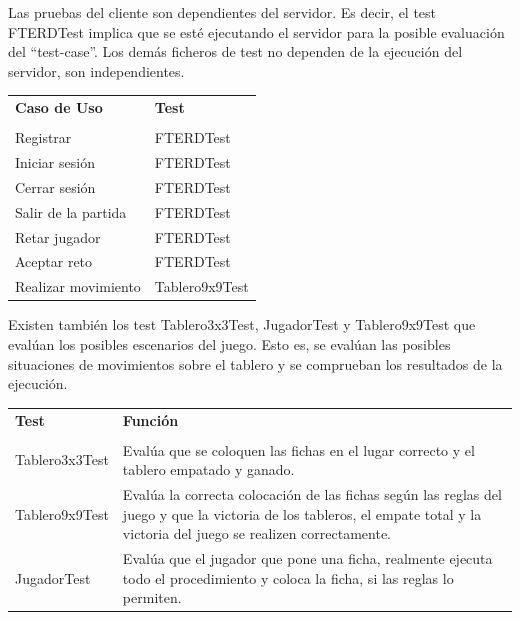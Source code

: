\documentclass[a4paper,11pt,oneside]{article}
\begin{document}
Las pruebas del cliente son dependientes del servidor. Es decir, el test FTERDTest implica que se esté ejecutando el servidor para la posible evaluación del ``test-case''. Los demás ficheros de test no dependen de la ejecución del servidor, son independientes.


\begin{center}
{\footnotesize
\begin{tabularx}{0.95\textwidth}{p{}|X}

\textbf{Caso de Uso} & \textbf{Test} \\
& \\
Registrar & FTERDTest\\
Iniciar sesión & FTERDTest\\
Cerrar sesión &FTERDTest \\
Salir de la partida & FTERDTest\\
Retar jugador &FTERDTest \\
Aceptar reto&FTERDTest\\
Realizar movimiento& Tablero9x9Test\\
\end{tabularx}
}
\end{center}

Existen también los test Tablero3x3Test, JugadorTest y Tablero9x9Test que evalúan los posibles escenarios del juego. Esto es, se evalúan las posibles situaciones de movimientos sobre el tablero y se comprueban los resultados de la ejecución.
\begin{center}
{\footnotesize
\begin{tabularx}{0.95\textwidth}{p{}|X}

\textbf{Test} & \textbf{Función} \\
& \\
Tablero3x3Test & Evalúa que se coloquen las fichas en el lugar correcto y el tablero empatado y ganado.\\
Tablero9x9Test & Evalúa la correcta colocación de las fichas según las reglas del juego y que la victoria de los tableros, el empate total y la victoria del juego se realizen correctamente. \\
JugadorTest &Evalúa que el jugador que pone una ficha, realmente ejecuta todo el procedimiento y coloca la ficha, si las reglas lo permiten. \\
\end{tabularx}
}
\end{center}


%
%
%
\end{document}
